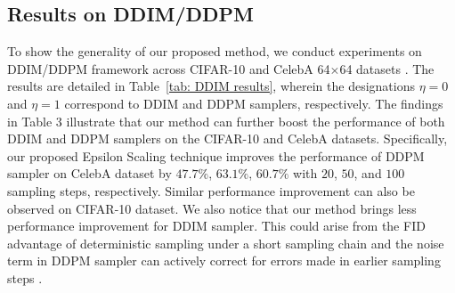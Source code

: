 \documentclass{article} \usepackage{iclr2024_conference,times}
\begin{document}
\subsection{Results on DDIM/DDPM}
To show the generality of our proposed method, we conduct experiments on DDIM/DDPM framework across CIFAR-10 and CelebA 64$\times$64 datasets \citep{liu2015faceattributes}. The results are detailed in Table~\ref{tab: DDIM results}, wherein the designations $\eta=0$ and $\eta=1$ correspond to DDIM and DDPM samplers, respectively. The findings in Table 3 illustrate that our method can further boost the performance of both DDIM and DDPM samplers on the CIFAR-10 and CelebA datasets. Specifically, our proposed Epsilon Scaling technique improves the performance of DDPM sampler on CelebA dataset by $47.7\%$, $63.1\%$, $60.7\%$ with $20$, $50$, and $100$ sampling steps, respectively. Similar performance improvement can also be observed on CIFAR-10 dataset. We also notice that our method brings less performance improvement for DDIM sampler. This could arise from the FID advantage of deterministic sampling under a short sampling chain and the noise term in DDPM sampler can actively correct for errors made in earlier sampling steps \citet{karras2022elucidating}.
\end{document}
